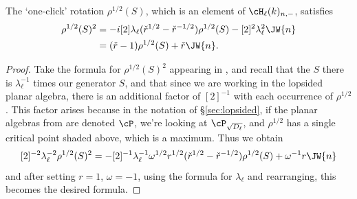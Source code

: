 \begin{lem}
\label{lem:S2}%
The `one-click' rotation $\rho^{1/2}(S)$, which is an element of $\cH_\ell(k)_{n,-}$, satisfies
\begin{align}
\rho^{1/2}(S)^2 & = -i [2] \lambda_\ell (\check{r}^{1/2} - \check{r}^{-1/2}) \rho^{1/2}(S) - [2]^2 \lambda_\ell^2 \JW{n} \notag \\
	& =  (\check{r}-1) \rho^{1/2}(S) + \check{r} \JW{n}. \label{eq:rhoS2}
\end{align}
\end{lem}
\begin{proof}
Take the formula for $\rho^{1/2}(S)^2$ appearing in \cite[Theorem 3.9]{0909.4099},
and recall that the $S$ there is $\lambda_\ell^{-1}$ times our generator $S$, and that since we are working in the lopsided planar algebra, there is an additional factor of $[2]^{-1}$ with each occurrence of $\rho^{1/2}$. This factor arises because in the notation of \S \ref{sec:lopsided}, if the planar algebras from \cite{0902.1294, 0909.4099} are denoted $\cP$, we're looking at $\cP_{\sqrt{D_\ell}}$, and $\rho^{1/2}$ has a single critical point shaded above, which is a maximum.
 Thus we obtain
$$[2]^{-2} \lambda_\ell^{-2} \rho^{1/2}(S)^2 = - [2]^{-1} \lambda_\ell^{-1} \omega^{1/2} r^{1/2} (\check{r}^{1/2} - \check{r}^{-1/2})\rho^{1/2}(S) + \omega^{-1} r \JW{n}$$
and after setting $r=1$, $\omega = -1$, using the formula for $\lambda_\ell$ and rearranging, this becomes the desired formula.
\end{proof}

